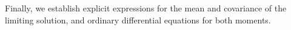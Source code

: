 Finally, we establish explicit expressions for the mean and covariance of the limiting solution, and ordinary differential equations for both moments.

